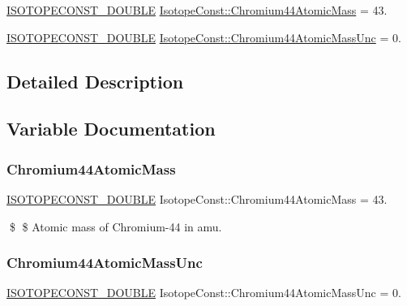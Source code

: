 \begin{DoxyCompactItemize}
\item 
\mbox{\hyperlink{group___isotope_const-_macros_ga8f45a7272ce02c0b4c65c44636ed719a}{I\+S\+O\+T\+O\+P\+E\+C\+O\+N\+S\+T\+\_\+\+D\+O\+U\+B\+LE}} \mbox{\hyperlink{group___isotope_const-_chromium-_cr44_ga674f1e4c70b1e999e7e067cb9a5aa93d}{Isotope\+Const\+::\+Chromium44\+Atomic\+Mass}} = 43.
\item 
\mbox{\hyperlink{group___isotope_const-_macros_ga8f45a7272ce02c0b4c65c44636ed719a}{I\+S\+O\+T\+O\+P\+E\+C\+O\+N\+S\+T\+\_\+\+D\+O\+U\+B\+LE}} \mbox{\hyperlink{group___isotope_const-_chromium-_cr44_ga0e3efad65930080a644e212101d84ea4}{Isotope\+Const\+::\+Chromium44\+Atomic\+Mass\+Unc}} = 0.
\end{DoxyCompactItemize}


\subsection{Detailed Description}


\subsection{Variable Documentation}
\mbox{\label{group___isotope_const-_chromium-_cr44_ga674f1e4c70b1e999e7e067cb9a5aa93d}} 
\subsubsection{\texorpdfstring{Chromium44\+Atomic\+Mass}{Chromium44AtomicMass}}
{\footnotesize\ttfamily \mbox{\hyperlink{group___isotope_const-_macros_ga8f45a7272ce02c0b4c65c44636ed719a}{I\+S\+O\+T\+O\+P\+E\+C\+O\+N\+S\+T\+\_\+\+D\+O\+U\+B\+LE}} Isotope\+Const\+::\+Chromium44\+Atomic\+Mass = 43.}

\$ \$ Atomic mass of Chromium-\/44 in amu. \mbox{\label{group___isotope_const-_chromium-_cr44_ga0e3efad65930080a644e212101d84ea4}} 
\subsubsection{\texorpdfstring{Chromium44\+Atomic\+Mass\+Unc}{Chromium44AtomicMassUnc}}
{\footnotesize\ttfamily \mbox{\hyperlink{group___isotope_const-_macros_ga8f45a7272ce02c0b4c65c44636ed719a}{I\+S\+O\+T\+O\+P\+E\+C\+O\+N\+S\+T\+\_\+\+D\+O\+U\+B\+LE}} Isotope\+Const\+::\+Chromium44\+Atomic\+Mass\+Unc = 0.}

